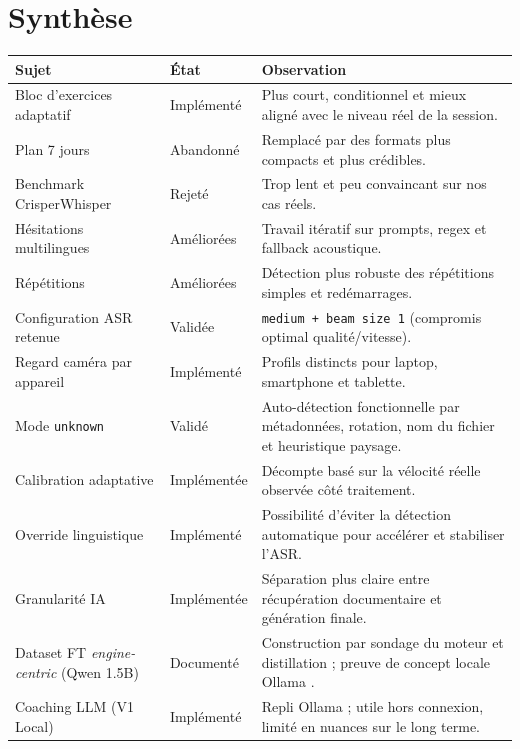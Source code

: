 ﻿\documentclass[12pt,a4paper]{article}
\begin{document}
\section{Synthèse}
\begin{table}[H]
    \centering
    \begin{tabularx}{\textwidth}{@{}p{5.4cm}p{2.5cm}X@{}}
        \toprule
        \textbf{Sujet} & \textbf{État} & \textbf{Observation} \\
        \midrule
        Bloc d'exercices adaptatif & Implémenté & Plus court, conditionnel et mieux aligné avec le niveau réel de la session. \\
        Plan 7 jours & Abandonné & Remplacé par des formats plus compacts et plus crédibles. \\
        Benchmark CrisperWhisper & Rejeté & Trop lent et peu convaincant sur nos cas réels. \\
        Hésitations multilingues & Améliorées & Travail itératif sur prompts, regex et fallback acoustique. \\
        Répétitions & Améliorées & Détection plus robuste des répétitions simples et redémarrages. \\
        Configuration ASR retenue & Validée & \texttt{medium + beam size 1} (compromis optimal qualité/vitesse). \\
        Regard caméra par appareil & Implémenté & Profils distincts pour laptop, smartphone et tablette. \\
        Mode \texttt{unknown} & Validé & Auto-détection fonctionnelle par métadonnées, rotation, nom du fichier et heuristique paysage. \\
        Calibration adaptative & Implémentée & Décompte basé sur la vélocité réelle observée côté traitement. \\
        Override linguistique & Implémenté & Possibilité d'éviter la détection automatique pour accélérer et stabiliser l'ASR. \\
        Granularité IA & Implémentée & Séparation plus claire entre récupération documentaire et génération finale. \\
        \midrule
        Dataset FT \textit{engine-centric} (Qwen 1.5B) & Documenté & Construction par sondage du moteur et distillation ; preuve de concept locale Ollama \cite{ollama,qwen25}. \\
        Coaching LLM (V1 Local) & Implémenté & Repli Ollama \cite{ollama} ; utile hors connexion, limité en nuances sur le long terme. \\

\end{tabularx}
\end{table}
\end{document}
